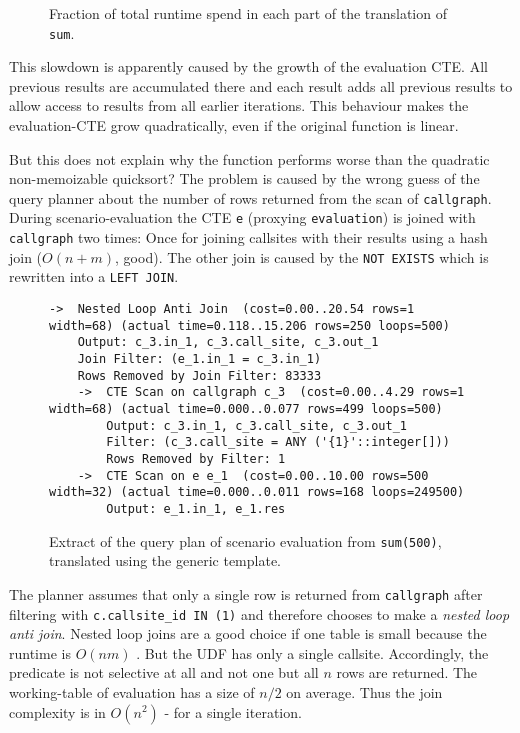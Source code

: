 \begin{figure}[h!]
    \centering\small
    
    \caption{Fraction of total runtime spend in each part of the translation of \texttt{sum}.}
    \label{fig:split_sr_times}
\end{figure}

This slowdown is apparently caused by the growth of the evaluation CTE. All previous results are accumulated there and each result adds all previous results to allow access to results from all earlier iterations. This behaviour makes the evaluation-CTE grow quadratically, even if the original function is linear.

But this does not explain why the function performs worse than the quadratic non-memoizable quicksort? The problem is caused by the wrong guess of the query planner about the number of rows returned from the scan of \texttt{callgraph}. During scenario-evaluation the CTE \texttt{e} (proxying \texttt{evaluation}) is joined with \texttt{callgraph} two times: Once for joining callsites with their results using a hash join ($O(n+m)$, good). The other join is caused by the \texttt{NOT EXISTS} which is rewritten into a \texttt{LEFT JOIN}.

\begin{figure}[h!]
    \centering\scriptsize
    \begin{verbatim}
->  Nested Loop Anti Join  (cost=0.00..20.54 rows=1 width=68) (actual time=0.118..15.206 rows=250 loops=500)
	Output: c_3.in_1, c_3.call_site, c_3.out_1
	Join Filter: (e_1.in_1 = c_3.in_1)
	Rows Removed by Join Filter: 83333
	->  CTE Scan on callgraph c_3  (cost=0.00..4.29 rows=1 width=68) (actual time=0.000..0.077 rows=499 loops=500)
	    Output: c_3.in_1, c_3.call_site, c_3.out_1
	    Filter: (c_3.call_site = ANY ('{1}'::integer[]))
	    Rows Removed by Filter: 1
	->  CTE Scan on e e_1  (cost=0.00..10.00 rows=500 width=32) (actual time=0.000..0.011 rows=168 loops=249500)
	    Output: e_1.in_1, e_1.res
    \end{verbatim}
    \caption{Extract of the query plan of scenario evaluation from \texttt{sum(500)}, translated using the generic template.}
    \label{plan:sum}
\end{figure}

The planner assumes that only a single row is returned from \texttt{callgraph} after filtering with \texttt{c.callsite\_id IN (1)} and therefore chooses to make a \textit{nested loop anti join}. Nested loop joins are a good choice if one table is small because the runtime is $O(nm)$ \cite{}. But the UDF has only a single callsite. Accordingly, the predicate is not selective at all and not one but all $n$ rows are returned. The working-table of evaluation has a size of $n/2$ on average. Thus the join complexity is in $O(n^2)$ - for a single iteration. 


